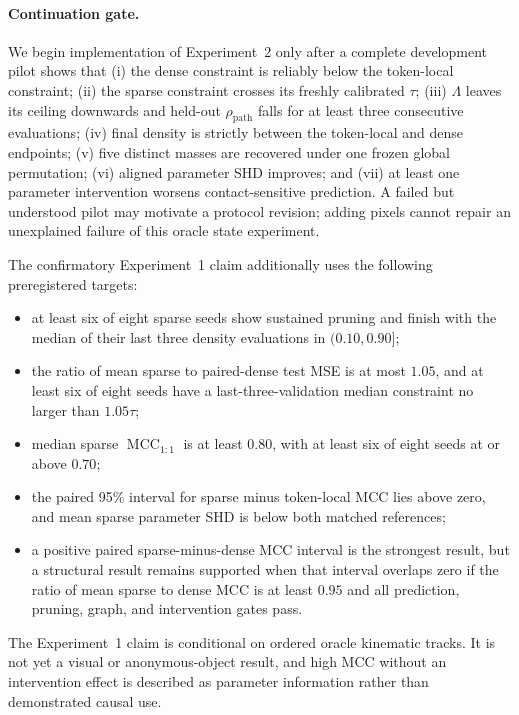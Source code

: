 \paragraph{Continuation gate.}
We begin implementation of Experiment~2 only after a complete development pilot shows that
(i) the dense constraint is reliably below the token-local constraint; (ii) the sparse constraint
crosses its freshly calibrated $\tau$; (iii) $\Lambda$ leaves its ceiling downwards and held-out
$\rho_{\mathrm{path}}$ falls for at least three consecutive evaluations; (iv) final density is
strictly between the token-local and dense endpoints; (v) five distinct masses are recovered
under one frozen global permutation; (vi) aligned parameter SHD improves; and (vii) at least one
parameter intervention worsens contact-sensitive prediction.  A failed but understood pilot may
motivate a protocol revision; adding pixels cannot repair an unexplained failure of this oracle
state experiment.

The confirmatory Experiment~1 claim additionally uses the following preregistered targets:
\begin{itemize}
    \item at least six of eight sparse seeds show sustained pruning and finish with the median of
          their last three density evaluations in $(0.10,0.90]$;
    \item the ratio of mean sparse to paired-dense test MSE is at most $1.05$, and at least six of
          eight seeds have a last-three-validation median constraint no larger than $1.05\tau$;
    \item median sparse $\operatorname{MCC}_{1:1}$ is at least $0.80$, with at least six of eight
          seeds at or above $0.70$;
    \item the paired 95\% interval for sparse minus token-local MCC lies above zero, and mean
          sparse parameter SHD is below both matched references;
    \item a positive paired sparse-minus-dense MCC interval is the strongest result, but a
          structural result remains supported when that interval overlaps zero if the ratio of
          mean sparse to dense MCC is at least $0.95$ and all prediction, pruning, graph, and
          intervention gates pass.
\end{itemize}
The Experiment~1 claim is conditional on ordered oracle kinematic tracks.  It is not yet a visual
or anonymous-object result, and high MCC without an intervention effect is described as parameter
information rather than demonstrated causal use.

